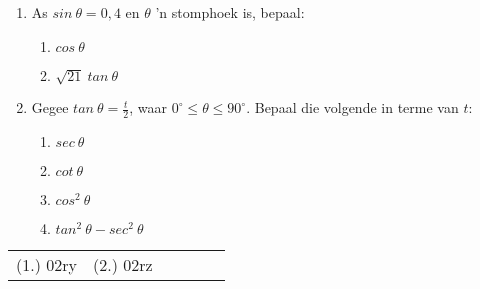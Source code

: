 \begin{exercises}{}
{\begin{enumerate}[itemsep=5pt, label=\textbf{\arabic*}. ]
\item As $sin~\theta= 0,4$ en $\theta$ 'n stomphoek is, bepaal:
\begin{enumerate}[noitemsep, label=\textbf{(\alph*)} ]
 \item $cos~\theta$
\item $\sqrt{21}~tan~\theta$
\end{enumerate}
\item Gegee $tan~ \theta = \frac{t}{2}$, waar $0^{\circ} \leq \theta \leq 90^{\circ}$.
Bepaal die volgende in terme van $t$:
\begin{enumerate}[noitemsep, label=\textbf{(\alph*)} ]
\item $sec~ \theta$
\item $cot~ \theta$
\item $cos^2~ \theta$
\item $tan^2~ \theta-sec^2~ \theta$
\end{enumerate}
\end{enumerate}

\par \practiceinfo
\par \begin{tabular}[h]{cccccc}
(1.)	02ry	&
(2.)	02rz	&
\end{tabular}
}
\end{exercises}


